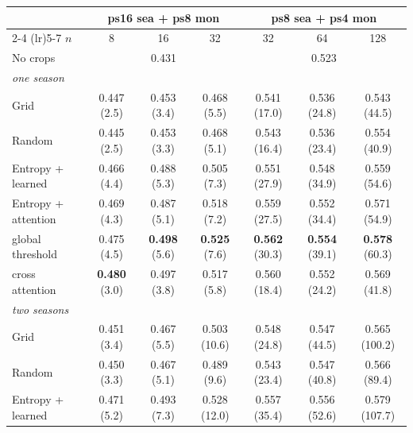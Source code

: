 \begin{table}[t]
\centering
\small
\begin{tabular}{lcccccc}
\toprule
 & \multicolumn{3}{c}{ps16 sea + ps8 mon} & \multicolumn{3}{c}{ps8 sea + ps4 mon} \\
\cmidrule(lr){2-4} \cmidrule(lr){5-7}
$n$ & 8 & 16 & 32 & 32 & 64 & 128 \\
\midrule
No crops & \multicolumn{3}{c}{0.431} & \multicolumn{3}{c}{0.523} \\
\midrule
\multicolumn{7}{l}{\emph{one season}} \\
Grid & 0.447 {\scriptsize(2.5)} & 0.453 {\scriptsize(3.4)} & 0.468 {\scriptsize(5.5)} & 0.541 {\scriptsize(17.0)} & 0.536 {\scriptsize(24.8)} & 0.543 {\scriptsize(44.5)} \\
Random & 0.445 {\scriptsize(2.5)} & 0.453 {\scriptsize(3.3)} & 0.468 {\scriptsize(5.1)} & 0.543 {\scriptsize(16.4)} & 0.536 {\scriptsize(23.4)} & 0.554 {\scriptsize(40.9)} \\
Entropy + learned & 0.466 {\scriptsize(4.4)} & 0.488 {\scriptsize(5.3)} & 0.505 {\scriptsize(7.3)} & 0.551 {\scriptsize(27.9)} & 0.548 {\scriptsize(34.9)} & 0.559 {\scriptsize(54.6)} \\
Entropy + attention & 0.469 {\scriptsize(4.3)} & 0.487 {\scriptsize(5.1)} & 0.518 {\scriptsize(7.2)} & 0.559 {\scriptsize(27.5)} & 0.552 {\scriptsize(34.4)} & 0.571 {\scriptsize(54.9)} \\
\quad global threshold & 0.475 {\scriptsize(4.5)} & \textbf{0.498} {\scriptsize(5.6)} & \textbf{0.525} {\scriptsize(7.6)} & \textbf{0.562} {\scriptsize(30.3)} & \textbf{0.554} {\scriptsize(39.1)} & \textbf{0.578} {\scriptsize(60.3)} \\
\quad\quad cross attention & \textbf{0.480} {\scriptsize(3.0)} & 0.497 {\scriptsize(3.8)} & 0.517 {\scriptsize(5.8)} & 0.560 {\scriptsize(18.4)} & 0.552 {\scriptsize(24.2)} & 0.569 {\scriptsize(41.8)} \\
\midrule
\multicolumn{7}{l}{\emph{two seasons}} \\
Grid & 0.451 {\scriptsize(3.4)} & 0.467 {\scriptsize(5.5)} & 0.503 {\scriptsize(10.6)} & 0.548 {\scriptsize(24.8)} & 0.547 {\scriptsize(44.5)} & 0.565 {\scriptsize(100.2)} \\
Random & 0.450 {\scriptsize(3.3)} & 0.467 {\scriptsize(5.1)} & 0.489 {\scriptsize(9.6)} & 0.543 {\scriptsize(23.4)} & 0.547 {\scriptsize(40.8)} & 0.566 {\scriptsize(89.4)} \\
Entropy + learned & 0.471 {\scriptsize(5.2)} & 0.493 {\scriptsize(7.3)} & 0.528 {\scriptsize(12.0)} & 0.557 {\scriptsize(35.4)} & 0.556 {\scriptsize(52.6)} & 0.579 {\scriptsize(107.7)} \\

\end{tabular}
\end{table}
